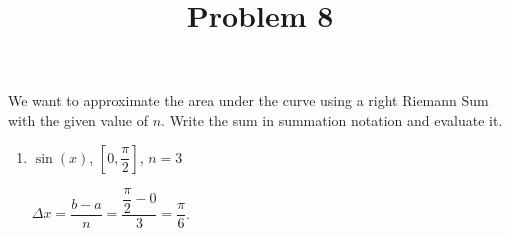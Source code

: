 \documentclass{ximera}
\title[Problem 8]{Problem 8}
\begin{document}
\begin{abstract} \end{abstract}
\maketitle


\begin{problem}
We want to approximate the area under the curve  using a right Riemann Sum with the given value of $n$. Write the sum in summation notation and evaluate it.
	\begin{enumerate}
	\item  $\sin (x)$, \; $\left[ 0, \dfrac{\pi}{2} \right]$, \; $n=3$
	
		\begin{explanation}
		
		$\Delta x=\dfrac{b-a}{n}=\dfrac{\dfrac{\pi }{2}-0}{3}=\dfrac{\pi }{6}$.  \\
		

\end{explanation}
\end{enumerate}
\end{problem}
\end{document}
